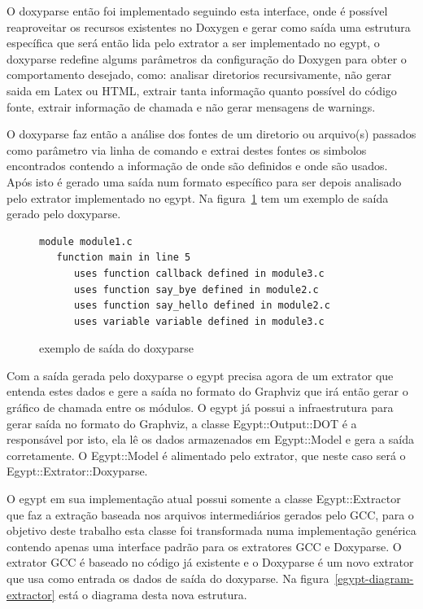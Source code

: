 O doxyparse então foi implementado seguindo esta interface, onde é possível
reaproveitar os recursos existentes no Doxygen e gerar como saída uma estrutura
específica que será então lida pelo extrator a ser implementado no egypt, o
doxyparse redefine algums parâmetros da configuração do Doxygen para obter o
comportamento desejado, como: analisar diretorios recursivamente, não gerar
saida em Latex ou HTML, extrair tanta informação quanto possível do código
fonte, extrair informação de chamada e não gerar mensagens de warnings.

O doxyparse faz então a análise dos fontes de um diretorio ou arquivo(s)
passados como parâmetro via linha de comando e extrai destes fontes os simbolos
encontrados contendo a informação de onde são definidos e onde são usados. Após
isto é gerado uma saída num formato específico para ser depois analisado pelo
extrator implementado no egypt. Na figura~\ref{exemplo-saida-doxyparse} tem um
exemplo de saída gerado pelo doxyparse.

\begin{figure}[h]
\begin{Verbatim}[frame=single,fontsize=\relsize{-2},fontfamily=courier]
module module1.c
   function main in line 5
      uses function callback defined in module3.c
      uses function say_bye defined in module2.c
      uses function say_hello defined in module2.c
      uses variable variable defined in module3.c
\end{Verbatim}
\caption{exemplo de saída do doxyparse}
\label{exemplo-saida-doxyparse}
\end{figure}

Com a saída gerada pelo doxyparse o egypt precisa agora de um extrator que
entenda estes dados e gere a saída no formato do Graphviz que irá então gerar o
gráfico de chamada entre os módulos. O egypt já possui a infraestrutura
para gerar saída no formato do Graphviz, a classe Egypt::Output::DOT é a
responsável por isto, ela lê os dados armazenados em Egypt::Model e gera a
saída corretamente. O Egypt::Model é alimentado pelo extrator, que neste caso será
o Egypt::Extrator::Doxyparse.

O egypt em sua implementação atual possui somente a classe Egypt::Extractor que
faz a extração baseada nos arquivos intermediários gerados pelo GCC, para o
objetivo deste trabalho esta classe foi transformada numa implementação
genérica contendo apenas uma interface padrão para os extratores GCC e
Doxyparse. O extrator GCC é baseado no código já existente e o Doxyparse é um
novo extrator que usa como entrada os dados de saída do doxyparse. Na
figura~\ref{egypt-diagram-extractor} está o diagrama desta nova estrutura.

